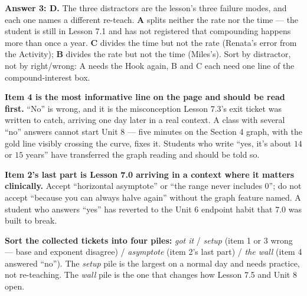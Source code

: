 \documentclass[10pt]{article}
\begin{document}
\begin{teachernote}
\textbf{Answer 3: D.} The three distractors are the lesson's three failure modes, and each one names a
different re-teach. \textbf{A} splits neither the rate nor the time --- the student is still in Lesson
7.1 and has not registered that compounding happens more than once a year. \textbf{C} divides the time
but not the rate (Renata's error from the Activity); \textbf{B} divides the rate but not the time
(Miles's). Sort by distractor, not by right/wrong: A needs the Hook again, B and C each need one line
of the compound-interest box.

\textbf{Item 4 is the most informative line on the page and should be read first.} ``No'' is wrong, and
it is the misconception Lesson 7.3's exit ticket was written to catch, arriving one day later in a real
context. A class with several ``no'' answers cannot start Unit 8 --- five minutes on the Section 4
graph, with the gold line visibly crossing the curve, fixes it. Students who write ``yes, it's about
$14$ or $15$ years'' have transferred the graph reading and should be told so.

\textbf{Item 2's last part is Lesson 7.0 arriving in a context where it matters clinically.} Accept
``horizontal asymptote'' or ``the range never includes $0$''; do not accept ``because you can always
halve again'' without the graph feature named. A student who answers ``yes'' has reverted to the Unit 6
endpoint habit that 7.0 was built to break.

\textbf{Sort the collected tickets into four piles:} \emph{got it} / \emph{setup} (item 1 or 3 wrong ---
base and exponent disagree) / \emph{asymptote} (item 2's last part) / \emph{the wall} (item 4 answered
``no''). The \emph{setup} pile is the largest on a normal day and needs practice, not re-teaching. The
\emph{wall} pile is the one that changes how Lesson 7.5 and Unit 8 open.
\end{teachernote}
\end{document}
